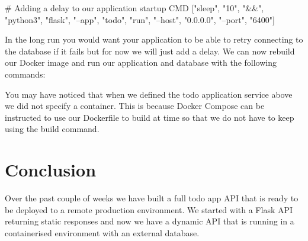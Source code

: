 \documentclass{csse4400}
\begin{document}
\begin{code}[language=docker,numbers=none]{}
# Adding a delay to our application startup
CMD ["sleep", "10", "&&", "python3", "flask", "--app", "todo", "run", "--host", "0.0.0.0", "--port", "6400"]
\end{code}

In the long run you would want your application to be able to retry connecting to the database if it fails but for now we will just add a delay.
We can now rebuild our Docker image and run our application and database with the following commands:


You may have noticed that when we defined the todo application service above we did not specify a container.
This is because Docker Compose can be instructed to use our Dockerfile to build at time so that we do not have to keep using the build command.








\section{Conclusion}

Over the past couple of weeks we have built a full todo app API that is ready to be deployed to a remote production environment.
We started with a Flask API returning static responses and now we have a dynamic API that is running in a containerised environment with an external database.
\end{document}
